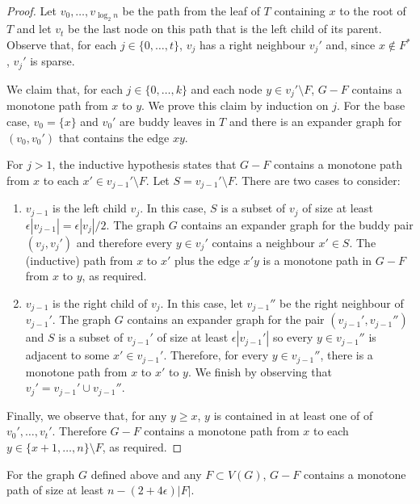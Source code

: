 \documentclass{patmorin}
\begin{document}
\begin{proof}
  Let $v_0,\ldots,v_{\log_2 n}$ be the path from the leaf of $T$
  containing $x$ to the root of $T$ and let $v_t$ be the last node on
  this path that is the left child of its parent.  Observe that, for
  each $j\in\{0,\ldots,t\}$, $v_j$ has a right neighbour $v_j'$ and,
  since $x\not\in F^*$, $v_j'$ is sparse.

  We claim that, for each $j\in\{0,\ldots,k\}$ and each node $y\in
  v_j'\setminus F$, $G-F$ contains a monotone path from $x$ to $y$.
  We prove this claim by induction on $j$.  For the base case, $v_0=\{x\}$
  and $v_0'$ are buddy leaves in $T$ and there is an expander graph
  for $(v_0,v_0')$
  that contains the edge $xy$.

  For $j>1$, the inductive hypothesis states that $G-F$ contains
  a monotone path from $x$ to each $x'\in v_{j-1}'\setminus F$.
  Let $S=v_{j-1}'\setminus F$.  There are two cases to consider:
  \begin{enumerate}
    \item $v_{j-1}$ is the left child $v_{j}$.  In this case,
	  $S$ is a subset of $v_j$ of size at least $\epsilon|v_{j-1}|
	  = \epsilon|v_j|/2$.  The graph $G$ contains an expander graph
	  for the buddy pair $(v_j,v_j')$ and therefore every $y\in v_j'$
	  contains a neighbour $x'\in S$.  The (inductive) path from
	  $x$ to $x'$ plus the edge $x'y$ is a monotone path in $G-F$
	  from $x$ to $y$, as required.

    \item $v_{j-1}$ is the right child of $v_j$.	In this case, let
	  $v_{j-1}''$ be the right neighbour of $v_{j-1}'$.
	  The graph $G$ contains an expander graph for the pair
	  $(v_{j-1}',v_{j-1}'')$ and $S$ is a subset of $v_{j-1}'$ of
	  size at least $\epsilon|v_{j-1}'|$ so every $y\in v_{j-1}''$ is
	  adjacent to some $x'\in v_{j-1}'$.  Therefore, for every $y\in
	  v_{j-1}''$, there is a monotone path from $x$ to $x'$ to $y$.
	  We finish by observing that $v_j' = v_{j-1}'\cup v_{j-1}''$.
  \end{enumerate}
  Finally, we observe that, for any $y\ge x$, $y$ is contained in at least one of of $v_0',\ldots,v_t'$.  Therefore $G-F$ contains a monotone path from $x$ to each $y\in\{x+1,\ldots,n\}\setminus F$, as required.
\end{proof}

\begin{prop}
	For the graph $G$ defined above and any $F\subset V(G)$, $G-F$ contains a monotone path of size at least $n-(2+4\epsilon)|F|$.
\end{prop}
\end{document}
